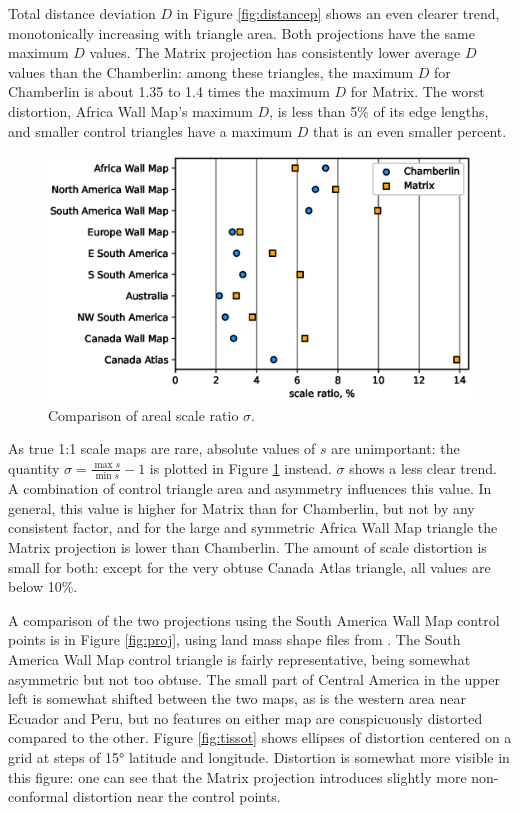 \documentclass[]{interact}
\begin{document}
Total distance deviation $D$ in Figure \ref{fig:distancep} shows an even clearer
trend, monotonically increasing with triangle area. Both projections have the
same maximum $D$ values. The Matrix projection has consistently
lower average $D$ values than the Chamberlin: among these triangles,
the maximum $D$ for Chamberlin is about 1.35 to 1.4 times
the maximum $D$ for Matrix. The worst distortion,
Africa Wall Map's maximum $D$, is less than 5\% of its edge lengths, and
smaller control triangles have a maximum $D$ that is an even smaller percent.

\begin{figure}
  \includegraphics[width=\textwidth]{scaleplot}
  \caption{Comparison of areal scale ratio $\sigma$.}
  \label{fig:scalep}
\end{figure}

As true 1:1 scale maps are rare, absolute values of $s$ are unimportant: the
quantity $\sigma = \frac{\max s}{\min s} - 1$ is plotted in Figure
\ref{fig:scalep} instead. $\sigma$ shows a less clear trend. A combination of
control triangle area and asymmetry influences this value. In general, this
value is higher for Matrix than for Chamberlin, but not by any consistent
factor, and for the large and symmetric Africa Wall Map triangle the Matrix
projection is lower than Chamberlin.
The amount of scale distortion is small for both:
except for the very obtuse Canada Atlas triangle, all values are below 10\%.

A comparison of the two projections using the South America Wall Map control
points is in Figure \ref{fig:proj}, using land mass shape files from
\citet{natearth}. The South America Wall Map control triangle is fairly
representative, being somewhat asymmetric but not too obtuse. The small part of
Central America in the upper left is somewhat shifted between the two maps, as
is the western area near Ecuador and Peru, but no features on either map are
conspicuously distorted compared to the other. Figure \ref{fig:tissot} shows
ellipses of distortion centered on a grid at steps of 15° latitude and
longitude. Distortion is somewhat more visible in this figure:
one can see that the Matrix projection
introduces slightly more non-conformal distortion near the control points.
\end{document}
